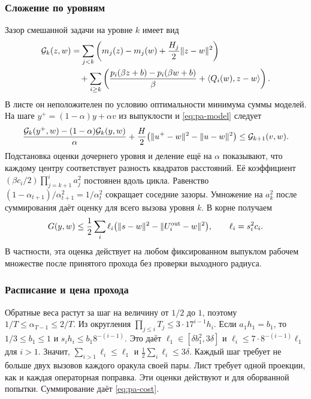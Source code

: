 \subsubsection{Сложение по уровням}

Зазор смешанной задачи на уровне $k$ имеет вид
\begin{align*}
 \mathcal G_k(z,w)
 &=\sum_{j<k}\left(m_j(z)-m_j(w)+\frac{H_j}{2}\lVert z-w\rVert^2\right)\\
 &\quad+\sum_{i\ge k}\left(
 \frac{p_i(\beta z+b)-p_i(\beta w+b)}{\beta}
 +\langle Q_i(w),z-w\rangle\right).
\end{align*}
В листе он неположителен по условию оптимальности минимума суммы
моделей. На шаге $y^+=(1-\alpha)y+\alpha v$ из выпуклости
и \eqref{eq:pa-model} следует
\[
 \frac{\mathcal G_k(y^+,w)-(1-\alpha)\mathcal G_k(y,w)}{\alpha}
 +\frac H2\bigl(\lVert u^+-w\rVert^2-\lVert u-w\rVert^2\bigr)
 \le\mathcal G_{k+1}(v,w).
\]
Подстановка оценки дочернего уровня и деление ещё на $\alpha$
показывают, что каждому центру соответствует разность квадратов
расстояний. Её коэффициент $(\beta c_i/2)\prod_{j=k+1}^{i}a_j^2$
постоянен вдоль цикла.
Равенство $(1-\alpha_{t+1})/\alpha_{t+1}^2=1/\alpha_t^2$
сокращает соседние зазоры. Умножение на $a_k^2$ после суммирования
даёт оценку для всего вызова уровня $k$. В корне получаем
\begin{equation}\label{eq:pa-energy}
 G(y,w)\le \frac12\sum_i \ell_i
     \bigl(\lVert s-w\rVert^2-\lVert U_i^{\rm out}-w\rVert^2\bigr),
 \qquad \ell_i=s_i^2c_i.
\end{equation}
В частности, эта оценка действует на любом фиксированном выпуклом
рабочем множестве после принятого прохода без проверки выходного радиуса.

\subsubsection{Расписание и цена прохода}

Обратные веса растут за шаг на величину от $1/2$ до $1$,
поэтому $1/T\le\alpha_{T-1}\le2/T$.
Из округления $\prod_{j\le i}T_j\le 3\cdot17^{i-1}h_i$.
Если $a_1h_1=b_1$, то $1/3\le b_1\le1$ и
$s_i h_i\le b_1 8^{-(i-1)}$. Это даёт
$\ell_1\in[\delta b_1^2,3\delta]$ и
$\ell_i\le7\cdot8^{-(i-1)}\ell_1$ для $i>1$.
Значит, $\sum_{i>1}\ell_i\le\ell_1$ и $\frac12\sum_i\ell_i\le3\delta$.
Каждый шаг требует не больше двух вызовов каждого оракула своей пары.
Лист требует одной проекции, как и каждая операторная поправка.
Эти оценки действуют и для оборванной попытки. Суммирование
даёт \eqref{eq:pa-cost}.

